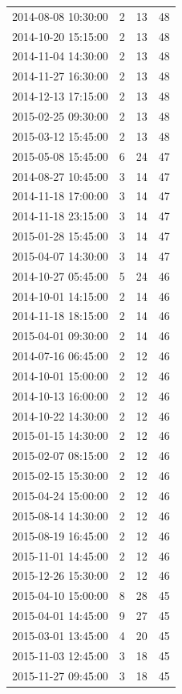 \begin{tabular}{lrrr}
2014-08-08 10:30:00 & 2 & 13 & 48 \\
2014-10-20 15:15:00 & 2 & 13 & 48 \\
2014-11-04 14:30:00 & 2 & 13 & 48 \\
2014-11-27 16:30:00 & 2 & 13 & 48 \\
2014-12-13 17:15:00 & 2 & 13 & 48 \\
2015-02-25 09:30:00 & 2 & 13 & 48 \\
2015-03-12 15:45:00 & 2 & 13 & 48 \\
2015-05-08 15:45:00 & 6 & 24 & 47 \\
2014-08-27 10:45:00 & 3 & 14 & 47 \\
2014-11-18 17:00:00 & 3 & 14 & 47 \\
2014-11-18 23:15:00 & 3 & 14 & 47 \\
2015-01-28 15:45:00 & 3 & 14 & 47 \\
2015-04-07 14:30:00 & 3 & 14 & 47 \\
2014-10-27 05:45:00 & 5 & 24 & 46 \\
2014-10-01 14:15:00 & 2 & 14 & 46 \\
2014-11-18 18:15:00 & 2 & 14 & 46 \\
2015-04-01 09:30:00 & 2 & 14 & 46 \\
2014-07-16 06:45:00 & 2 & 12 & 46 \\
2014-10-01 15:00:00 & 2 & 12 & 46 \\
2014-10-13 16:00:00 & 2 & 12 & 46 \\
2014-10-22 14:30:00 & 2 & 12 & 46 \\
2015-01-15 14:30:00 & 2 & 12 & 46 \\
2015-02-07 08:15:00 & 2 & 12 & 46 \\
2015-02-15 15:30:00 & 2 & 12 & 46 \\
2015-04-24 15:00:00 & 2 & 12 & 46 \\
2015-08-14 14:30:00 & 2 & 12 & 46 \\
2015-08-19 16:45:00 & 2 & 12 & 46 \\
2015-11-01 14:45:00 & 2 & 12 & 46 \\
2015-12-26 15:30:00 & 2 & 12 & 46 \\
2015-04-10 15:00:00 & 8 & 28 & 45 \\
2015-04-01 14:45:00 & 9 & 27 & 45 \\
2015-03-01 13:45:00 & 4 & 20 & 45 \\
2015-11-03 12:45:00 & 3 & 18 & 45 \\
2015-11-27 09:45:00 & 3 & 18 & 45 \\

\end{tabular}
